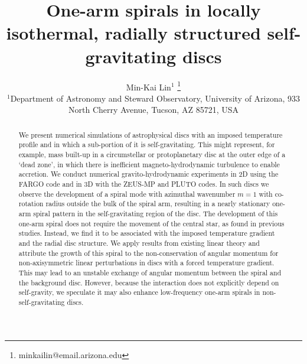 \documentclass[useAMS,usenatbib]{mn2e}
\title[One-arm spirals]{One-arm spirals in 
  locally isothermal, radially structured self-gravitating discs}
\author[Lin]{Min-Kai Lin$^{1}$
  \thanks{ minkailin@email.arizona.edu} \\ 
  $^1$Department of Astronomy and Steward Observatory, University of
  Arizona, 933 North Cherry Avenue, Tucson, AZ 85721, USA 
}
\begin{document}
\maketitle
\begin{abstract} 
  We present numerical simulations of astrophysical discs with an 
  imposed temperature profile and in which a sub-portion of it is
  self-gravitating. This might represent, for example, mass  
  built-up in a circumstellar or protoplanetary
  disc at the outer edge of a `dead zone', in which there
  is inefficient magneto-hydrodynamic turbulence to enable accretion. 
  We conduct numerical gravito-hydrodynamic experiments in 2D using
  the FARGO code and in 3D with the ZEUS-MP and PLUTO codes. In such
  discs we observe the development of a 
  spiral mode with azimuthal wavenumber $m=1$ with co-rotation radius 
  outside the bulk of the spiral arm, resulting in a nearly stationary 
  one-arm spiral pattern in the self-gravitating region of the
  disc. The development of this one-arm 
  spiral does not require the movement of  
  the central star, as found in previous studies. Instead, we find it 
  to be associated with the imposed 
  temperature gradient and the radial disc structure. 
  We apply results from existing linear theory and attribute the
  growth of this spiral to the non-conservation of angular momentum
  for non-axisymmetric linear perturbations in discs with a forced temperature
  gradient. This may lead to an unstable exchange of angular momentum between the spiral 
  and the background disc. However, because the interaction does
  not explicitly depend on self-gravity, we speculate it may also
  enhance low-frequency one-arm spirals in non-self-gravitating
  discs. 

\end{abstract}
\end{document}
